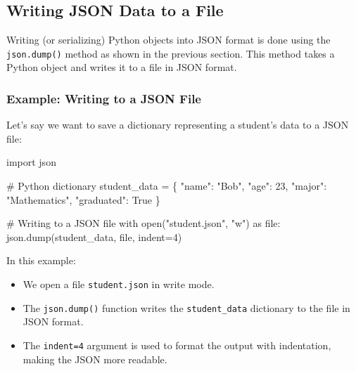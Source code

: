 \documentclass[
  letterpaper,
  DIV=11,
  numbers=noendperiod]{scrreprt}
\newenvironment{Shaded}{\begin{snugshade}}{\end{snugshade}}
\newcommand{\BuiltInTok}[1]{\textcolor[rgb]{0.00,0.23,0.31}{#1}}
\newcommand{\CommentTok}[1]{\textcolor[rgb]{0.37,0.37,0.37}{#1}}
\newcommand{\ControlFlowTok}[1]{\textcolor[rgb]{0.00,0.23,0.31}{#1}}
\newcommand{\DecValTok}[1]{\textcolor[rgb]{0.68,0.00,0.00}{#1}}
\newcommand{\ImportTok}[1]{\textcolor[rgb]{0.00,0.46,0.62}{#1}}
\newcommand{\NormalTok}[1]{\textcolor[rgb]{0.00,0.23,0.31}{#1}}
\newcommand{\OperatorTok}[1]{\textcolor[rgb]{0.37,0.37,0.37}{#1}}
\newcommand{\StringTok}[1]{\textcolor[rgb]{0.13,0.47,0.30}{#1}}
\newcommand{\VariableTok}[1]{\textcolor[rgb]{0.07,0.07,0.07}{#1}}
\providecommand{\tightlist}{%
  \setlength{\itemsep}{0pt}\setlength{\parskip}{0pt}}\usepackage{longtable,booktabs,array}
\begin{document}
\hypertarget{writing-json-data-to-a-file}{%
\subsection{Writing JSON Data to a
File}\label{writing-json-data-to-a-file}}

Writing (or serializing) Python objects into JSON format is done using
the \texttt{json.dump()} method as shown in the previous section. This
method takes a Python object and writes it to a file in JSON format.

\hypertarget{example-writing-to-a-json-file}{%
\subsubsection{Example: Writing to a JSON
File}\label{example-writing-to-a-json-file}}

Let's say we want to save a dictionary representing a student's data to
a JSON file:

\begin{Shaded}
\begin{Highlighting}[]
\ImportTok{import}\NormalTok{ json}

\CommentTok{\# Python dictionary}
\NormalTok{student\_data }\OperatorTok{=}\NormalTok{ \{}
    \StringTok{"name"}\NormalTok{: }\StringTok{"Bob"}\NormalTok{,}
    \StringTok{"age"}\NormalTok{: }\DecValTok{23}\NormalTok{,}
    \StringTok{"major"}\NormalTok{: }\StringTok{"Mathematics"}\NormalTok{,}
    \StringTok{"graduated"}\NormalTok{: }\VariableTok{True}
\NormalTok{\}}

\CommentTok{\# Writing to a JSON file}
\ControlFlowTok{with} \BuiltInTok{open}\NormalTok{(}\StringTok{"student.json"}\NormalTok{, }\StringTok{"w"}\NormalTok{) }\ImportTok{as} \BuiltInTok{file}\NormalTok{:}
\NormalTok{    json.dump(student\_data, }\BuiltInTok{file}\NormalTok{, indent}\OperatorTok{=}\DecValTok{4}\NormalTok{)}
\end{Highlighting}
\end{Shaded}

In this example:

\begin{itemize}
\tightlist
\item
  We open a file \texttt{student.json} in write mode.
\item
  The \texttt{json.dump()} function writes the \texttt{student\_data}
  dictionary to the file in JSON format.
\item
  The \texttt{indent=4} argument is used to format the output with
  indentation, making the JSON more readable.
\end{itemize}
\end{document}
